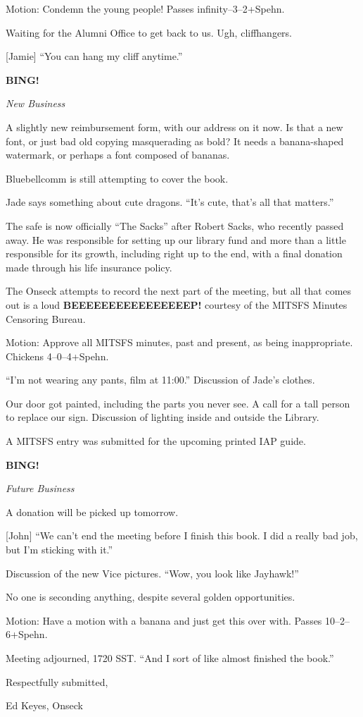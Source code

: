 \documentclass[12pt]{article}
\newcommand{\bing}{{\bf BING!} }
\newcommand{\goto}[1]{\bing \vskip 12pt \centerline{{\em{#1}}}}
\begin{document}
Motion: Condemn the young people!  Passes infinity--3--2+Spehn.

Waiting for the Alumni Office to get back to us.  Ugh, cliffhangers.

[Jamie] ``You can hang my cliff anytime.''

\goto{New Business}

A slightly new reimbursement form, with our address on it now.  Is that
a new font, or just bad old copying masquerading as bold?  It needs a
banana-shaped watermark, or perhaps a font composed of bananas.

Bluebellcomm is still attempting to cover the book.

Jade says something about cute dragons.  ``It's cute, that's all
that matters.''

The safe is now officially ``The Sacks'' after Robert Sacks, who
recently passed away.  He was responsible for setting up our library
fund and more than a little responsible for its growth, including
right up to the end, with a final donation made through his life
insurance policy.

The Onseck attempts to record the next part of the meeting, but all
that comes out is a loud {\bf BEEEEEEEEEEEEEEEEP!} courtesy of the
MITSFS Minutes Censoring Bureau.


Motion: Approve all MITSFS minutes, past and present, as being
inappropriate.  Chickens 4--0--4+Spehn.

``I'm not wearing any pants, film at 11:00.''  Discussion of Jade's
clothes.

Our door got painted, including the parts you never see.  A call for
a tall person to replace our sign.  Discussion of lighting inside and
outside the Library.

A MITSFS entry was submitted for the upcoming printed IAP guide.

\goto{Future Business}

A donation will be picked up tomorrow.

[John] ``We can't end the meeting before I finish this book.  I
did a really bad job, but I'm sticking with it.''

Discussion of the new Vice pictures.  ``Wow, you look like
Jayhawk!''

No one is seconding anything, despite several golden opportunities.

Motion: Have a motion with a banana and just get this over with.
Passes 10--2--6+Spehn.

\vspace{12pt}

\noindent
Meeting adjourned, 1720 SST.  ``And I sort of like almost finished
the book.''

\vspace{18pt}

\centerline{Respectfully submitted,}
\centerline{Ed Keyes, Onseck}
\end{document}
